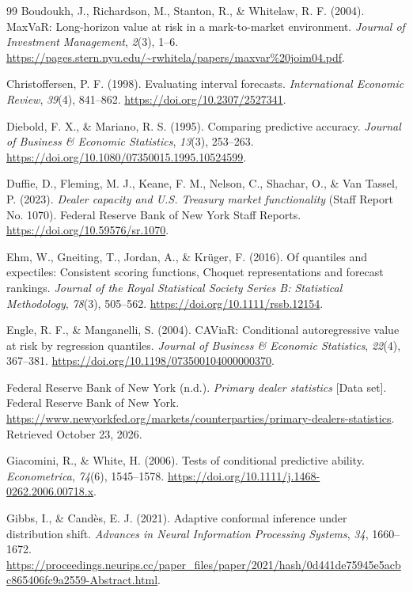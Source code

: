 \documentclass[11pt,a4paper]{article}
\begin{document}
\begin{thebibliography}{99}
 Boudoukh, J., Richardson, M., Stanton, R., \& Whitelaw, R. F. (2004). MaxVaR: Long-horizon value at risk in a mark-to-market environment. \emph{Journal of Investment Management}, \emph{2}(3), 1--6. \url{https://pages.stern.nyu.edu/~rwhitela/papers/maxvar%20joim04.pdf}.

 Christoffersen, P. F. (1998). Evaluating interval forecasts. \emph{International Economic Review}, \emph{39}(4), 841--862. \url{https://doi.org/10.2307/2527341}.

 Diebold, F. X., \& Mariano, R. S. (1995). Comparing predictive accuracy. \emph{Journal of Business \& Economic Statistics}, \emph{13}(3), 253--263. \url{https://doi.org/10.1080/07350015.1995.10524599}.

 Duffie, D., Fleming, M. J., Keane, F. M., Nelson, C., Shachar, O., \& Van Tassel, P. (2023). \emph{Dealer capacity and U.S. Treasury market functionality} (Staff Report No. 1070). Federal Reserve Bank of New York Staff Reports. \url{https://doi.org/10.59576/sr.1070}.

 Ehm, W., Gneiting, T., Jordan, A., \& Krüger, F. (2016). Of quantiles and expectiles: Consistent scoring functions, Choquet representations and forecast rankings. \emph{Journal of the Royal Statistical Society Series B: Statistical Methodology}, \emph{78}(3), 505--562. \url{https://doi.org/10.1111/rssb.12154}.

 Engle, R. F., \& Manganelli, S. (2004). CAViaR: Conditional autoregressive value at risk by regression quantiles. \emph{Journal of Business \& Economic Statistics}, \emph{22}(4), 367--381. \url{https://doi.org/10.1198/073500104000000370}.

 Federal Reserve Bank of New York (n.d.). \emph{Primary dealer statistics} [Data set]. Federal Reserve Bank of New York. \url{https://www.newyorkfed.org/markets/counterparties/primary-dealers-statistics}. Retrieved October 23, 2026.

 Giacomini, R., \& White, H. (2006). Tests of conditional predictive ability. \emph{Econometrica}, \emph{74}(6), 1545--1578. \url{https://doi.org/10.1111/j.1468-0262.2006.00718.x}.

 Gibbs, I., \& Candès, E. J. (2021). Adaptive conformal inference under distribution shift. \emph{Advances in Neural Information Processing Systems}, \emph{34}, 1660--1672. \url{https://proceedings.neurips.cc/paper_files/paper/2021/hash/0d441de75945e5acbc865406fc9a2559-Abstract.html}.


\end{thebibliography}
\end{document}
